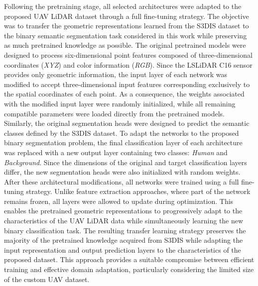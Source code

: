Following the pretraining stage, all selected architectures were adapted to the proposed UAV LiDAR dataset through a full fine-tuning strategy. The objective was to transfer the geometric representations learned from the S3DIS dataset to the binary semantic segmentation task considered in this work while preserving as much pretrained knowledge as possible. The original pretrained models were designed to process six-dimensional point features composed of three-dimensional coordinates (\textit{XYZ}) and color information (\textit{RGB}). Since the LSLiDAR C16 sensor provides only geometric information, the input layer of each network was modified to accept three-dimensional input features corresponding exclusively to the spatial coordinates of each point. As a consequence, the weights associated with the modified input layer were randomly initialized, while all remaining compatible parameters were loaded directly from the pretrained models. Similarly, the original segmentation heads were designed to predict the semantic classes defined by the S3DIS dataset. To adapt the networks to the proposed binary segmentation problem, the final classification layer of each architecture was replaced with a new output layer containing two classes: \textit{Human} and \textit{Background}. Since the dimensions of the original and target classification layers differ, the new segmentation heads were also initialized with random weights. After these architectural modifications, all networks were trained using a full fine-tuning strategy. Unlike feature extraction approaches, where part of the network remains frozen, all layers were allowed to update during optimization. This enables the pretrained geometric representations to progressively adapt to the characteristics of the UAV LiDAR data while simultaneously learning the new binary classification task. The resulting transfer learning strategy preserves the majority of the pretrained knowledge acquired from S3DIS while adapting the input representation and output prediction layers to the characteristics of the proposed dataset. This approach provides a suitable compromise between efficient training and effective domain adaptation, particularly considering the limited size of the custom UAV dataset.

